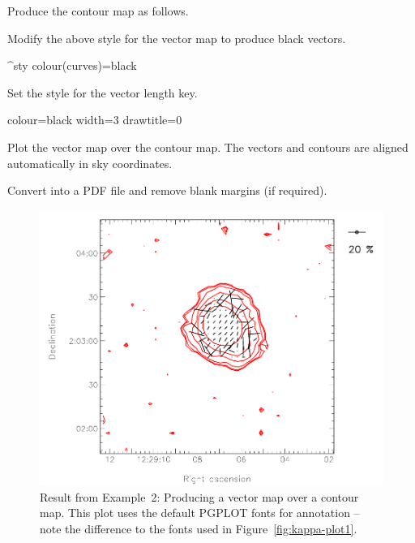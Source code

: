 Produce the contour map as follows.

\begin{terminalv}
\end{terminalv}


Modify the above style for the vector map to produce black vectors.

\begin{terminalv}
^sty
colour(curves)=black
\end{terminalv}


Set the style for the vector length key.


\begin{terminalv}
colour=black
width=3
drawtitle=0
\end{terminalv}

Plot the vector map over the contour map. The vectors and contours are
aligned automatically in sky coordinates.

\begin{terminalv}
\end{terminalv}


Convert into a PDF file and remove blank margins (if required).

\begin{terminalv}
\end{terminalv}

\begin{figure}[t!]
\begin{center}
\includegraphics[width=0.75\linewidth]{sc22-kappa-plots-plot2.png}

\caption [Vector map with contour map in polplot]{Result from Example~2:
  Producing a vector map over a contour map. This plot uses the default
PGPLOT fonts for annotation -- note the difference to the fonts used in
Figure~\ref{fig:kappa-plot1}. \label{fig:kappa-plot2}}
\end{center}
\end{figure}

